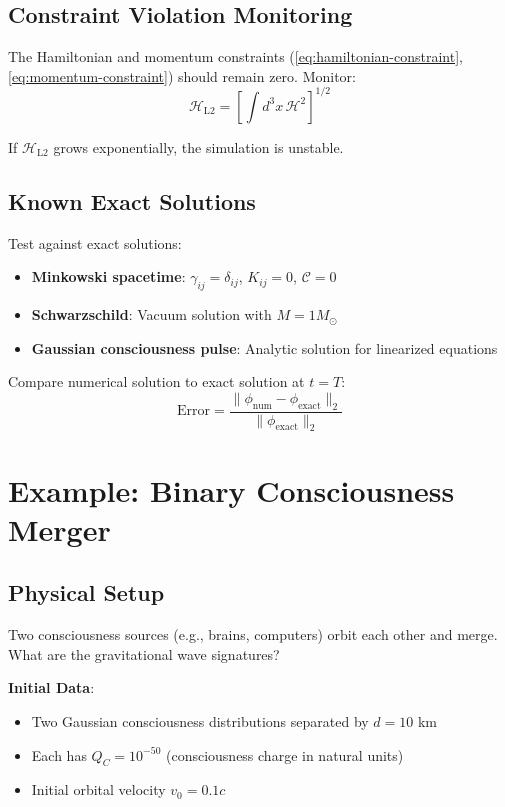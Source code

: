 \subsection{Constraint Violation Monitoring}

The Hamiltonian and momentum constraints (\ref{eq:hamiltonian-constraint}, \ref{eq:momentum-constraint}) should remain zero. Monitor:
\begin{equation}
\mathcal{H}_{\text{L2}} = \left[ \int d^3x \, \mathcal{H}^2 \right]^{1/2}
\end{equation}

If $\mathcal{H}_{\text{L2}}$ grows exponentially, the simulation is unstable.

\subsection{Known Exact Solutions}

Test against exact solutions:
\begin{itemize}
\item \textbf{Minkowski spacetime}: $\gamma_{ij} = \delta_{ij}$, $K_{ij} = 0$, $\mathcal{C} = 0$
\item \textbf{Schwarzschild}: Vacuum solution with $M = 1 M_\odot$
\item \textbf{Gaussian consciousness pulse}: Analytic solution for linearized equations
\end{itemize}

Compare numerical solution to exact solution at $t = T$:
\begin{equation}
\text{Error} = \frac{\| \phi_{\text{num}} - \phi_{\text{exact}} \|_2}{\| \phi_{\text{exact}} \|_2}
\end{equation}

\section{Example: Binary Consciousness Merger}

\subsection{Physical Setup}

Two consciousness sources (e.g., brains, computers) orbit each other and merge. What are the gravitational wave signatures?

\textbf{Initial Data}:
\begin{itemize}
\item Two Gaussian consciousness distributions separated by $d = 10$ km
\item Each has $Q_C = 10^{-50}$ (consciousness charge in natural units)
\item Initial orbital velocity $v_0 = 0.1c$
\end{itemize}

